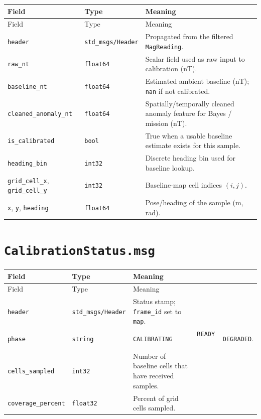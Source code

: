 \begin{center}
\small
\begin{longtable}{@{}llp{7.2cm}@{}}
\toprule
Field & Type & Meaning \\
\midrule
\endfirsthead
\toprule
Field & Type & Meaning \\
\midrule
\endhead
\texttt{header} & \texttt{std\_msgs/Header} & Propagated from the filtered \texttt{MagReading}. \\
\texttt{raw\_nt} & \texttt{float64} & Scalar field used as raw input to calibration (nT). \\
\texttt{baseline\_nt} & \texttt{float64} & Estimated ambient baseline (nT); \texttt{nan} if not calibrated. \\
\texttt{cleaned\_anomaly\_nt} & \texttt{float64} & Spatially/temporally cleaned anomaly feature for Bayes / mission (nT). \\
\texttt{is\_calibrated} & \texttt{bool} & True when a usable baseline estimate exists for this sample. \\
\texttt{heading\_bin} & \texttt{int32} & Discrete heading bin used for baseline lookup. \\
\texttt{grid\_cell\_x}, \texttt{grid\_cell\_y} & \texttt{int32} & Baseline-map cell indices \((i,j)\). \\
\texttt{x}, \texttt{y}, \texttt{heading} & \texttt{float64} & Pose/heading of the sample (m, rad). \\
\bottomrule
\end{longtable}
\end{center}


\section{\texttt{CalibrationStatus.msg}}


\begin{center}
\small
\begin{longtable}{@{}p{2.1cm}p{2.1cm}p{2.1cm}p{2.1cm}p{3.2cm}@{}}
\toprule
Field & Type & Meaning &  &  \\
\midrule
\endfirsthead
\toprule
Field & Type & Meaning &  &  \\
\midrule
\endhead
\texttt{header} & \texttt{std\_msgs/Header} & Status stamp; \texttt{frame\_id} set to \texttt{map}. &  &  \\
\texttt{phase} & \texttt{string} & \texttt{CALIBRATING} \ & \texttt{READY} \ & \texttt{DEGRADED}. \\
\texttt{cells\_sampled} & \texttt{int32} & Number of baseline cells that have received samples. &  &  \\
\texttt{coverage\_percent} & \texttt{float32} & Percent of grid cells sampled. &  &  \\
\bottomrule
\end{longtable}
\end{center}


